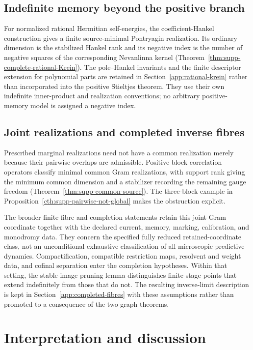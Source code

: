 \documentclass[11pt]{article}
\theoremstyle{definition}
\theoremstyle{remark}
\theoremstyle{definition}
\theoremstyle{remark}
\begin{document}
\subsection{Indefinite memory beyond the positive branch}

For normalized rational Hermitian self-energies, the coefficient-Hankel
construction gives a finite source-minimal Pontryagin realization.  Its
ordinary dimension is the stabilized Hankel rank and its negative index is
the number of negative squares of the corresponding Nevanlinna kernel
(Theorem~\ref{thm:supp-complete-rational-Krein}).  The pole--Hankel invariants and
the finite descriptor extension for polynomial parts are retained in
Section~\ref{app:rational-krein} rather than incorporated into the positive
Stieltjes theorem.  They use their own indefinite inner-product and realization
conventions; no arbitrary positive-memory model is assigned a negative index.

\subsection{Joint realizations and completed inverse fibres}

Prescribed marginal realizations need not have a common realization merely
because their pairwise overlaps are admissible.  Positive block correlation
operators classify minimal common Gram realizations, with support rank giving
the minimum common dimension and a stabilizer recording the remaining gauge
freedom (Theorem~\ref{thm:supp-common-source}).  The three-block example in
Proposition~\ref{cth:supp-pairwise-not-global} makes the obstruction explicit.

The broader finite-fibre and completion statements retain this joint Gram
coordinate together with the declared current, memory, marking, calibration,
and monodromy data.  They concern the specified fully reduced
retained-coordinate class, not an unconditional exhaustive classification of
all microscopic predictive dynamics.  Compactification, compatible restriction
maps, resolvent and weight data, and cofinal separation enter the completion
hypotheses.  Within that setting, the stable-image pruning lemma distinguishes
finite-stage points that extend indefinitely from those that do not.  The
resulting inverse-limit description is kept in
Section~\ref{app:completed-fibres} with these assumptions rather than promoted
to a consequence of the two graph theorems.

\section{Interpretation and discussion}
\label{sec:discussion}
\end{document}
